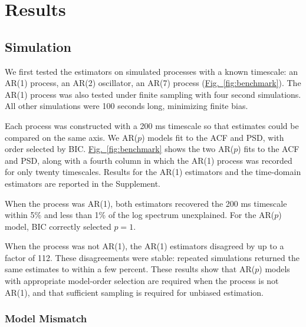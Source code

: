 \documentclass[pdflatex,lineno,sn-nature]{sn-jnl}
\newcommand{\figpanel}[3][]{\hyperref[#2]{Fig.~#1\ref*{#2}#3}}
\theoremstyle{thmstyleone}
\theoremstyle{thmstyletwo}
\theoremstyle{thmstylethree}
\begin{document}
\section{Results}\label{sec:results}

\subsection{Simulation}\label{sec:sim}

We first tested the estimators on simulated processes with a known timescale: an AR(1) process, an AR(2) oscillator, an AR(7) process (\figpanel{fig:benchmark}{}). The AR(1) process was also tested under finite sampling with four second simulations. All other simulations were 100 seconds long, minimizing finite bias.

Each process was constructed with a 200 ms timescale so that estimates could be compared on the same axis. We AR($p$) models fit to the ACF and PSD, with order selected by BIC. \figpanel{fig:benchmark}{} shows the two AR($p$) fits to the ACF and PSD, along with a fourth column in which the AR(1) process was recorded for only twenty timescales. Results for the AR(1) estimators and the time-domain estimators are reported in the Supplement.

When the process was AR(1), both estimators recovered the 200 ms timescale within 5\% and less than 1\% of the log spectrum unexplained. For the AR($p$) model, BIC correctly selected $p = 1$.

When the process was not AR(1), the AR(1) estimators disagreed by up to a factor of 112. These disagreements were stable: repeated simulations returned the same estimates to within a few percent. These results show that AR($p$) models with appropriate model-order selection are required when the process is not AR(1), and that sufficient sampling is required for unbiased estimation.

\subsubsection{Model Mismatch}\label{sec:modes}
\end{document}
